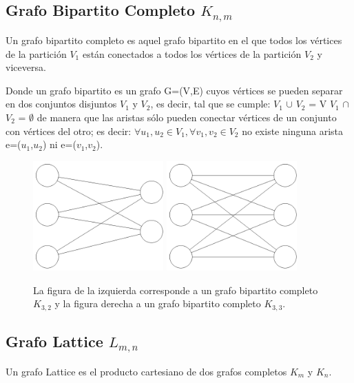 \subsection{Grafo Bipartito Completo $K_{n,m}$}
Un grafo bipartito completo es aquel grafo bipartito en el que todos los vértices de la partición $V_1$ están conectados a todos los vértices de la partición $V_2$ y viceversa.

Donde un grafo bipartito es un grafo G=(V,E) cuyos vértices se pueden separar en dos conjuntos disjuntos $V_1$ y $V_2$, es decir, tal que se cumple:
$V_1$ $\cup$ $V_2$ = V
$V_1$ $\cap$ $V_2$ = $\emptyset$
de manera que las aristas sólo pueden conectar vértices de un conjunto con vértices del otro; es decir:
$\forall u_1, u_2 \in V_1, \forall v_1, v_2 \in V_2$ no existe ninguna arista e=($u_1$,$u_2$) ni e=($v_1$,$v_2$).

\begin{figure}[H]
\centering
\includegraphics[width=50mm]{K3_2.png}
\includegraphics[width=50mm]{K3_3.png}
\caption{La figura de la izquierda corresponde a un grafo bipartito completo $K_{3,2}$ y la figura derecha a un grafo bipartito completo $K_{3,3}$.}
\label{overflow}
\end{figure}


\subsection{Grafo Lattice $L_{m,n}$}
Un grafo Lattice es el producto cartesiano de dos grafos completos $K_m$ y $K_n$.

